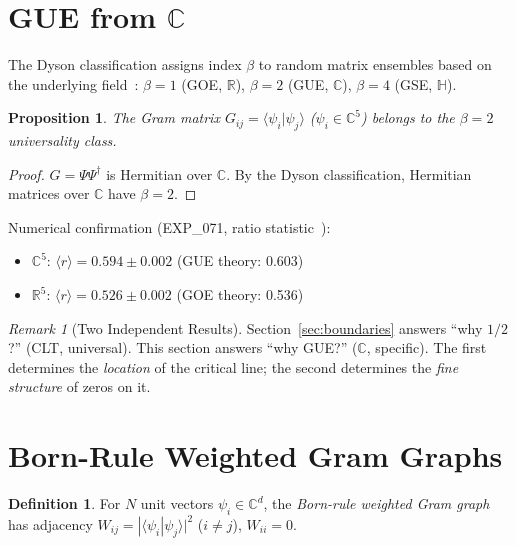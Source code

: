 \documentclass[12pt]{article}
\newtheorem{proposition}[theorem]{Proposition}
\theoremstyle{definition}
\newtheorem{definition}[theorem]{Definition}
\theoremstyle{remark}
\newtheorem{remark}[theorem]{Remark}
\newcommand{\CC}{\mathbb{C}}
\newcommand{\RR}{\mathbb{R}}
\newcommand{\HH}{\mathbb{H}}
\begin{document}
\section{GUE from $\CC$}
\label{sec:gue}

The Dyson classification assigns index $\beta$ to random
matrix ensembles based on the underlying field~\cite{Dyson}:
$\beta = 1$ (GOE, $\RR$), $\beta = 2$ (GUE, $\CC$),
$\beta = 4$ (GSE, $\HH$).

\begin{proposition}\label{prop:gue}
The Gram matrix $G_{ij} = \langle\psi_i|\psi_j\rangle$
($\psi_i \in \CC^5$) belongs to the $\beta = 2$ universality
class.
\end{proposition}

\begin{proof}
$G = \Psi\Psi^\dagger$ is Hermitian over $\CC$.
By the Dyson classification, Hermitian matrices over $\CC$
have $\beta = 2$.
\end{proof}

Numerical confirmation (EXP\_071, ratio statistic~\cite{Atas2013}):
\begin{itemize}
\item $\CC^5$: $\langle r \rangle = 0.594 \pm 0.002$
  (GUE theory: 0.603)
\item $\RR^5$: $\langle r \rangle = 0.526 \pm 0.002$
  (GOE theory: 0.536)
\end{itemize}

\begin{remark}[Two Independent Results]
Section~\ref{sec:boundaries} answers ``why $1/2$?''
(CLT, universal). This section answers ``why GUE?''
($\CC$, specific). The first determines the \emph{location} of the
critical line; the second determines the \emph{fine structure}
of zeros on it.
\end{remark}

\section{Born-Rule Weighted Gram Graphs}
\label{sec:born}

\begin{definition}
For $N$ unit vectors $\psi_i \in \CC^d$, the \emph{Born-rule
weighted Gram graph} has adjacency
$W_{ij} = |\langle\psi_i|\psi_j\rangle|^2$ ($i \neq j$),
$W_{ii} = 0$.
\end{definition}
\end{document}
